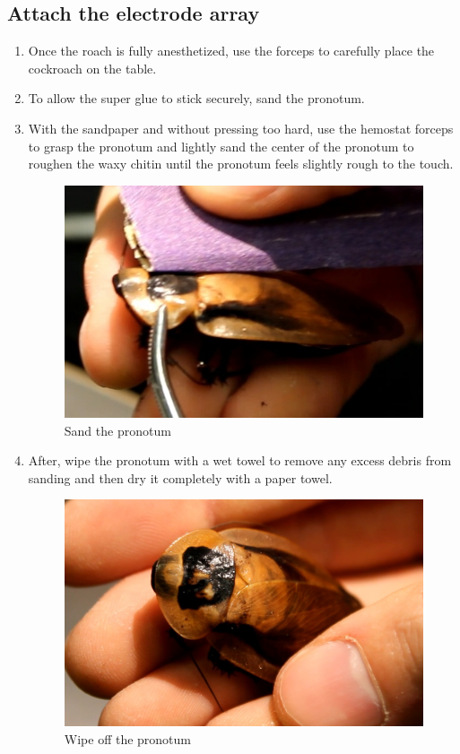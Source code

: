 \subsection{Attach the electrode array}
\begin{enumerate}
\item Once the roach is fully anesthetized, use the forceps to carefully place the cockroach on the table. 
\item To allow the super glue to stick securely, sand the pronotum.

\item With the sandpaper and without pressing too hard, use the hemostat forceps to grasp the pronotum and lightly sand the center of the pronotum to roughen the waxy chitin until the pronotum feels slightly rough to the touch.  
\begin{figure}[ht!]
\centering
\includegraphics[scale=0.25]{Surgery Photos/sand.jpg}
\caption{Sand the pronotum}
\label{fig:sand}
\end{figure}

\item After, wipe the pronotum with a wet towel to remove any excess debris from sanding and then dry it completely with a paper towel.
\begin{figure}[ht!]
\centering
\includegraphics[scale=0.15]{Surgery Photos/wipe.jpg}
\caption{Wipe off the pronotum}
\label{fig:wipe}
\end{figure}
    

\end{enumerate}
